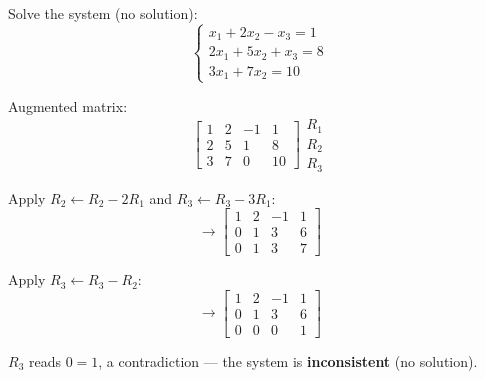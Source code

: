 \begin{example}
  Solve the system (no solution):
  \[
    \begin{cases}
      x_1 + 2x_2 - x_3 = 1  \\
      2x_1 + 5x_2 + x_3 = 8 \\
      3x_1 + 7x_2 = 10
    \end{cases}
  \]

  Augmented matrix:
  \[
    \left[
      \begin{array}{ccc|c}
        1 & 2 & -1 & 1  \\
        2 & 5 & 1  & 8  \\
        3 & 7 & 0  & 10
      \end{array}
      \right]
    \begin{matrix}
      R_1 \\ R_2 \\ R_3
    \end{matrix}
  \]

  Apply $R_2 \leftarrow R_2 - 2R_1$ and $R_3 \leftarrow R_3 - 3R_1$:
  \[
    \longrightarrow
    \left[
      \begin{array}{ccc|c}
        1 & 2 & -1 & 1 \\
        0 & 1 & 3  & 6 \\
        0 & 1 & 3  & 7
      \end{array}
      \right]
  \]

  Apply $R_3 \leftarrow R_3 - R_2$:
  \[
    \longrightarrow
    \left[
      \begin{array}{ccc|c}
        1 & 2 & -1 & 1 \\
        0 & 1 & 3  & 6 \\
        0 & 0 & 0  & 1
      \end{array}
      \right]
  \]

  $R_3$ reads $0 = 1$, a contradiction --- the system is \textbf{inconsistent} (no solution).
\end{example}

